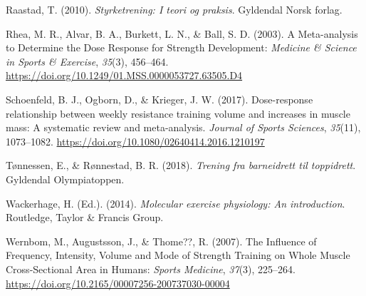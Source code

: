 \documentclass[
  letterpaper,
  DIV=11,
  numbers=noendperiod]{scrartcl}
\newlength{\cslhangindent}
\newlength{\cslentryspacingunit} %
\newenvironment{CSLReferences}[2] %
 {%
  \setlength{\parindent}{0pt}
  \ifodd #1
  \let\oldpar\par
  \def\par{\hangindent=\cslhangindent\oldpar}
  \fi
  \setlength{\parskip}{#2\cslentryspacingunit}
 }%
 {}
\begin{document}
\begin{CSLReferences}{1}{0}
\leavevmode{}%
Raastad, T. (2010). \emph{Styrketrening: I teori og praksis}. Gyldendal
Norsk forlag.

\leavevmode{}%
Rhea, M. R., Alvar, B. A., Burkett, L. N., \& Ball, S. D. (2003). A
{Meta}-analysis to {Determine} the {Dose} {Response} for {Strength}
{Development}: \emph{Medicine \& Science in Sports \& Exercise},
\emph{35}(3), 456--464.
\url{https://doi.org/10.1249/01.MSS.0000053727.63505.D4}

\leavevmode{}%
Schoenfeld, B. J., Ogborn, D., \& Krieger, J. W. (2017). Dose-response
relationship between weekly resistance training volume and increases in
muscle mass: {A} systematic review and meta-analysis. \emph{Journal of
Sports Sciences}, \emph{35}(11), 1073--1082.
\url{https://doi.org/10.1080/02640414.2016.1210197}

\leavevmode{}%
Tønnessen, E., \& Rønnestad, B. R. (2018). \emph{Trening fra barneidrett
til toppidrett}. Gyldendal Olympiatoppen.

\leavevmode{}%
Wackerhage, H. (Ed.). (2014). \emph{Molecular exercise physiology: An
introduction}. Routledge, Taylor \& Francis Group.

\leavevmode{}%
Wernbom, M., Augustsson, J., \& Thome??, R. (2007). The {Influence} of
{Frequency}, {Intensity}, {Volume} and {Mode} of {Strength} {Training}
on {Whole} {Muscle} {Cross}-{Sectional} {Area} in {Humans}: \emph{Sports
Medicine}, \emph{37}(3), 225--264.
\url{https://doi.org/10.2165/00007256-200737030-00004}

\end{CSLReferences}
\end{document}
